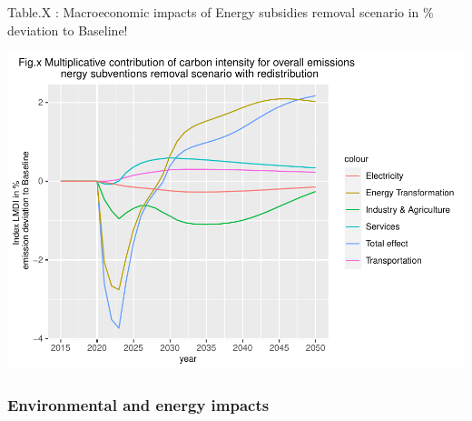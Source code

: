 \documentclass[
]{article}
\begin{document}
Table.X : Macroeconomic impacts of Energy subsidies removal scenario in
\% deviation to Baseline!

\includegraphics{Modele-ThreeMe-Tunisie_Sequeira_Valilou_Wang_files/figure-latex/unnamed-chunk-32-1.pdf}

\hypertarget{environmental-and-energy-impacts}{%
\subsubsection{Environmental and energy
impacts}\label{environmental-and-energy-impacts}}
\end{document}
